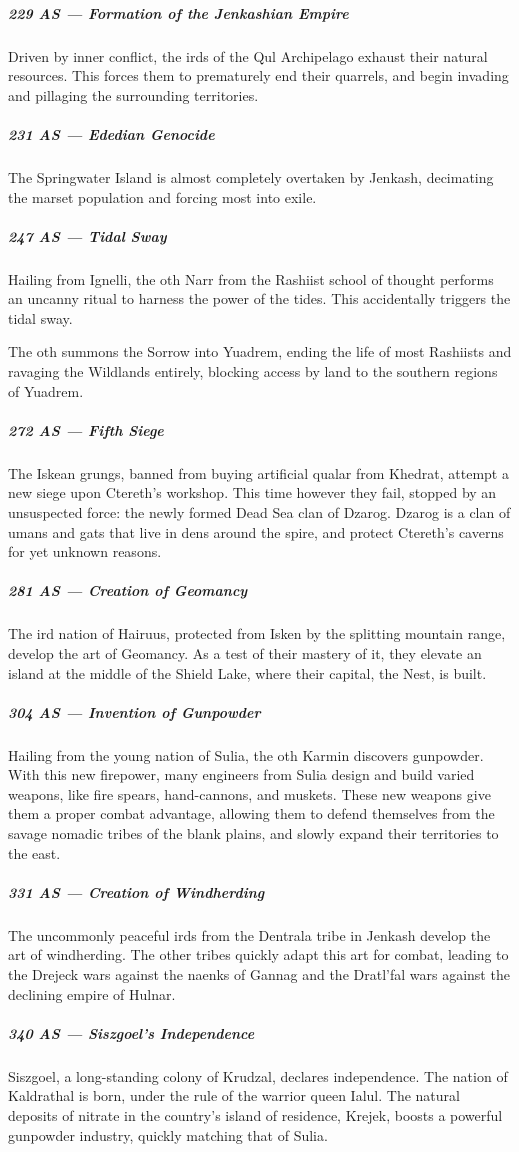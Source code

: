 \subparagraph{229 AS --- Formation of the Jenkashian Empire} Driven by inner conflict, the irds of the Qul Archipelago exhaust their natural resources.
This forces them to prematurely end their quarrels, and begin invading and pillaging the surrounding territories.

\subparagraph{231 AS --- Ededian Genocide} The Springwater Island is almost completely overtaken by Jenkash, decimating the marset population and forcing most into exile.

\subparagraph{247 AS --- Tidal Sway} Hailing from Ignelli, the oth Narr from the Rashiist school of thought performs an uncanny ritual to harness the power of the tides.
This accidentally triggers the tidal sway.

The oth summons the Sorrow into Yuadrem, ending the life of most Rashiists and ravaging the Wildlands entirely, blocking access by land to the southern regions of Yuadrem.

\subparagraph{272 AS --- Fifth Siege} The Iskean grungs, banned from buying artificial qualar from Khedrat, attempt a new siege upon Ctereth's workshop.
This time however they fail, stopped by an unsuspected force: the newly formed Dead Sea clan of Dzarog.
Dzarog is a clan of umans and gats that live in dens around the spire, and protect Ctereth's caverns for yet unknown reasons.

\subparagraph{281 AS --- Creation of Geomancy} The ird nation of Hairuus, protected from Isken by the splitting mountain range, develop the art of Geomancy.
As a test of their mastery of it, they elevate an island at the middle of the Shield Lake, where their capital, the Nest, is built.

\subparagraph{304 AS --- Invention of Gunpowder} Hailing from the young nation of Sulia, the oth Karmin discovers gunpowder.
With this new firepower, many engineers from Sulia design and build varied weapons, like fire spears, hand-cannons, and muskets.
These new weapons give them a proper combat advantage, allowing them to defend themselves from the savage nomadic tribes of the blank plains, and slowly expand their territories to the east.

\subparagraph{331 AS --- Creation of Windherding} The uncommonly peaceful irds from the Dentrala tribe in Jenkash develop the art of windherding.
The other tribes quickly adapt this art for combat, leading to the Drejeck wars against the naenks of Gannag and the Dratl'fal wars against the declining empire of Hulnar.

\subparagraph{340 AS --- Siszgoel's Independence} Siszgoel, a long-standing colony of Krudzal, declares independence.
The nation of Kaldrathal is born, under the rule of the warrior queen Ialul.
The natural deposits of nitrate in the country's island of residence, Krejek, boosts a powerful gunpowder industry, quickly matching that of Sulia.


